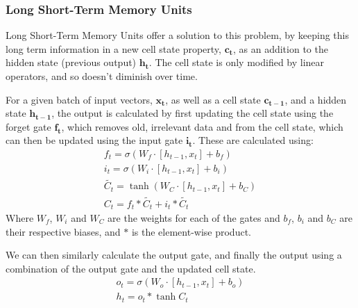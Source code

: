\documentclass[12pt,a4paper,twoside,openright]{report}
\begin{document}
\subsubsection{Long Short-Term Memory Units}
Long Short-Term Memory Units offer a solution to this problem, by keeping this long term information in a new cell state property, $\mathbf{c_t}$, as an addition to the hidden state (previous output) $\mathbf{h_t}$. The cell state is only modified by linear operators, and so doesn't diminish over time.
\newline
 
For a given batch of input vectors, $\mathbf{x_t}$, as well as a cell state $\mathbf{c_{t-1}}$, and a hidden state $\mathbf{h_{t-1}}$, the output is calculated by first updating the cell state using the forget gate $\mathbf{f_t}$, which removes old, irrelevant data and from the cell state, which can then be updated using the input gate $\mathbf{i_t}$. These are calculated using:
\begin{gather}
    f_t = \sigma (W_f \cdot [h_{t-1}, x_t] + b_f) \\
    i_t = \sigma (W_i \cdot [h_{t-1}, x_t] + b_i) \\
    \widetilde{C_t} = \tanh{(W_C \cdot [h_{t-1}, x_t] + b_C)} \\
    C_t  = f_t * \widetilde{C_t} + i_t * \widetilde{C_t}
\end{gather}
Where $W_f$, $W_i$ and $W_C$ are the weights for each of the gates and $b_f$, $b_i$ and $b_C$ are their respective biases, and $*$ is the element-wise product. 
\newline
 
We can then similarly calculate the output gate, and finally the output using a combination of the output gate and the updated cell state.
\begin{gather}
    o_t = \sigma (W_o \cdot [h_{t-1}, x_t] + b_o) \\
    h_t = o_t * \tanh{C_t}
\end{gather}

 
\end{document}

